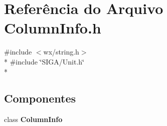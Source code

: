 \section{Referência do Arquivo Column\+Info.\+h}
\label{_column_info_8h}
{\ttfamily \#include $<$wx/string.\+h$>$}\\*
{\ttfamily \#include \char`\"{}S\+I\+G\+A/\+Unit.\+h\char`\"{}}\\*
\subsection*{Componentes}
\begin{DoxyCompactItemize}
\item 
class {\bf Column\+Info}
\end{DoxyCompactItemize}
